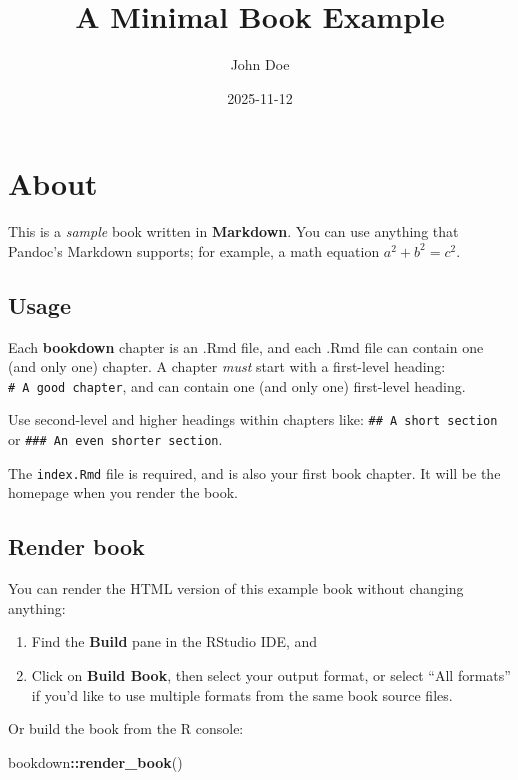 \documentclass[
]{book}
\title{A Minimal Book Example}
\author{John Doe}
\date{2025-11-12}
\newenvironment{Shaded}{\begin{snugshade}}{\end{snugshade}}
\newcommand{\FunctionTok}[1]{\textcolor[rgb]{0.13,0.29,0.53}{\textbf{#1}}}
\newcommand{\NormalTok}[1]{#1}
\newcommand{\SpecialCharTok}[1]{\textcolor[rgb]{0.81,0.36,0.00}{\textbf{#1}}}
\theoremstyle{definition}
\theoremstyle{definition}
\theoremstyle{definition}
\theoremstyle{definition}
\theoremstyle{remark}
\begin{document}
\maketitle

{
\setcounter{tocdepth}{1}
\tableofcontents
}
\chapter{About}\label{about}

This is a \emph{sample} book written in \textbf{Markdown}. You can use anything that Pandoc's Markdown supports; for example, a math equation \(a^2 + b^2 = c^2\).

\section{Usage}\label{usage}

Each \textbf{bookdown} chapter is an .Rmd file, and each .Rmd file can contain one (and only one) chapter. A chapter \emph{must} start with a first-level heading: \texttt{\#\ A\ good\ chapter}, and can contain one (and only one) first-level heading.

Use second-level and higher headings within chapters like: \texttt{\#\#\ A\ short\ section} or \texttt{\#\#\#\ An\ even\ shorter\ section}.

The \texttt{index.Rmd} file is required, and is also your first book chapter. It will be the homepage when you render the book.

\section{Render book}\label{render-book}

You can render the HTML version of this example book without changing anything:

\begin{enumerate}
\def\labelenumi{\arabic{enumi}.}
\item
  Find the \textbf{Build} pane in the RStudio IDE, and
\item
  Click on \textbf{Build Book}, then select your output format, or select ``All formats'' if you'd like to use multiple formats from the same book source files.
\end{enumerate}

Or build the book from the R console:

\begin{Shaded}
\begin{Highlighting}[]
\NormalTok{bookdown}\SpecialCharTok{::}\FunctionTok{render\_book}\NormalTok{()}
\end{Highlighting}
\end{Shaded}
\end{document}
